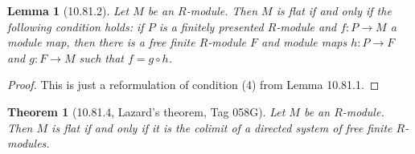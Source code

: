 \documentclass[UTF8,11pt]{ctexart}
\newtheorem*{theorem}{Theorem}
\newtheorem*{lemma}{Lemma}
\theoremstyle{definition}
\begin{document}
\begin{lemma}[10.81.2]
Let $M$ be an $R$-module. Then $M$ is flat if and only if the following condition holds: if $P$ is a finitely presented $R$-module and $f:P\to M$ a module map, then there is a free finite $R$-module $F$ and module maps $h:P\to F$ and $g:F\to M$ such that $f=g\circ h$.
\end{lemma}
\begin{proof}
This is just a reformulation of condition (4) from Lemma 10.81.1.
\end{proof}

\begin{theorem}[10.81.4, Lazard's theorem, Tag 058G]
Let $M$ be an $R$-module. Then $M$ is flat if and only if it is the colimit of a directed system of free finite $R$-modules.
\end{theorem}
\end{document}

